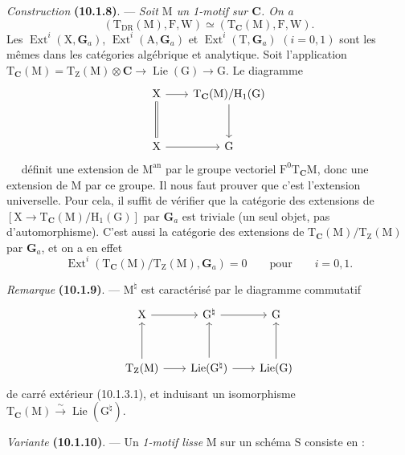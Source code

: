 \documentclass[11pt,leqno]{article}
\newcommand{\Page}[1]{\ifvmode\noindent\else\unskip\ \fi{\footnotesize\textcolor{gray}{[p.\,#1]}}\ \ignorespaces}
\begin{document}
\textit{Construction} \textbf{(10.1.8)}. —
\textit{Soit \(\mathrm{M}\) un 1-motif sur \(\mathbf{C}\). On a}
\[
(\mathrm{T}_{\mathrm{DR}}(\mathrm{M}),\mathrm{F},\mathrm{W})
\simeq
(\mathrm{T}_{\mathbf{C}}(\mathrm{M}),\mathrm{F},\mathrm{W}).
\]
Les \(\operatorname{Ext}^i(\mathrm{X},\mathbf{G}_a)\),
\(\operatorname{Ext}^i(\mathrm{A},\mathbf{G}_a)\) et
\(\operatorname{Ext}^i(\mathrm{T},\mathbf{G}_a)\) \((i=0,1)\)
sont les mêmes dans les catégories algébrique et analytique.
Soit l’application
\(\mathrm{T}_{\mathbf{C}}(\mathrm{M})
=\mathrm{T}_{\mathrm{Z}}(\mathrm{M})\otimes\mathbf{C}
\to\operatorname{Lie}(\mathrm{G})\to\mathrm{G}\).
Le diagramme
\[
\begin{tikzcd}[column sep=2em, row sep=3em]
\mathrm{X} \arrow[r] \arrow[d, equal]
&
\mathrm{T}_{\mathbf{C}}(\mathrm{M})/\mathrm{H}_1(\mathrm{G})
  \arrow[d]
\\
\mathrm{X} \arrow[r]
&
\mathrm{G}
\end{tikzcd}
\]
\Page{59}
définit une extension de \(\mathrm{M}^{\mathrm{an}}\) par le groupe
vectoriel \(\mathrm{F}^0\mathrm{T}_{\mathbf{C}}\mathrm{M}\), donc une
extension de \(\mathrm{M}\) par ce groupe. Il nous faut prouver que
c’est l’extension universelle. Pour cela, il suffit de vérifier que
la catégorie des extensions de
\([\mathrm{X}\to\mathrm{T}_{\mathbf{C}}(\mathrm{M})/\mathrm{H}_1(\mathrm{G})]\)
par \(\mathbf{G}_a\) est triviale (un seul objet, pas d’automorphisme).
C’est aussi la catégorie des extensions de
\(\mathrm{T}_{\mathbf{C}}(\mathrm{M})/\mathrm{T}_{\mathrm{Z}}(\mathrm{M})\)
par \(\mathbf{G}_a\), et on a en effet
\[
\operatorname{Ext}^i
(\mathrm{T}_{\mathbf{C}}(\mathrm{M})/\mathrm{T}_{\mathrm{Z}}(\mathrm{M}),
\mathbf{G}_a)=0
\qquad\text{pour}\qquad i=0,1.
\]

\textit{Remarque} \textbf{(10.1.9)}. —
\(\mathrm{M}^{\natural}\) est caractérisé par le diagramme commutatif
\[
\begin{tikzcd}[column sep=2em, row sep=3.2em]
\mathrm{X} \arrow[r]
&
\mathrm{G}^{\natural} \arrow[r]
&
\mathrm{G}
\\
\mathrm{T}_{\mathrm{Z}}(\mathrm{M}) \arrow[r] \arrow[u]
&
\operatorname{Lie}(\mathrm{G}^{\natural}) \arrow[r] \arrow[u]
&
\operatorname{Lie}(\mathrm{G}) \arrow[u]
\end{tikzcd}
\]
de carré extérieur (10.1.3.1), et induisant un isomorphisme
\(\mathrm{T}_{\mathbf{C}}(\mathrm{M})
\xrightarrow{\sim}\operatorname{Lie}(\mathrm{G}^{\natural})\).

\textit{Variante} \textbf{(10.1.10)}. —
Un \textit{1-motif lisse} \(\mathrm{M}\) sur un schéma \(\mathrm{S}\)
consiste en :
\end{document}
